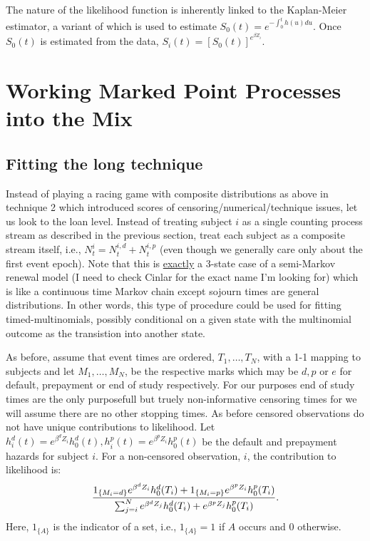 \documentclass[10pt]{article}
\begin{document}
The nature of the likelihood function is inherently linked to the Kaplan-Meier estimator, a variant of which is used to estimate $S_0(t)=e^{-\int_0^th(u)du}$. 
Once $S_0(t)$ is estimated from the data, $S_i(t)=[S_0(t)]^{e^{\beta Z_i}}$.

\section{Working Marked Point Processes into the Mix}

\subsection{Fitting the long technique}

Instead of playing a racing game with composite distributions as above in technique 2 which introduced scores of censoring/numerical/technique issues, let us 
look to the loan level.  Instead of treating subject $i$ as a single counting process stream as described in the previous section, treat each subject as a 
composite stream itself, i.e., $N^i_t=N^{i,d}_t+N^{i,p}_t$ (even though we generally care only about the first event epoch).
Note that 
this is \underline{exactly} a 3-state case of a semi-Markov renewal model (I need to check Cinlar for the exact name I'm looking for) which is like a continuous 
time Markov chain except sojourn times are general distributions.  In other words, this type of procedure could be used for fitting timed-multinomials, 
possibly conditional on a given state with the multinomial outcome as the transistion into another state.

As before, assume that event times are ordered, $T_1, \ldots, T_N$, with a 1-1 mapping to subjects and let $M_1, \ldots, M_N$, be the respective marks which 
may be $d, p$ or $e$ for default, prepayment or end of study respectively.  For our purposes end of study times are the only purposefull but truely non-informative 
censoring times for we will assume there are no other stopping times.  As before censored observations do not have unique contributions to likelihood.  Let 
$h^d_i(t)=e^{\beta^d Z_i}h^d_0(t), h^p_i(t)=e^{\beta^p Z_i}h^p_0(t)$ be the default and prepayment hazards for subject $i$.
For a non-censored observation, $i$, the contribution to likelihood is:
$$ {{1_{\{M_i=d\}}e^{\beta^d Z_i}h^d_0(T_i)+1_{\{M_i=p\}}e^{\beta^p Z_i}h^p_0(T_i) } 
\over { \sum_{j=i}^N e^{\beta^d Z_j}h^d_0(T_i)+e^{\beta^p Z_j}h^p_0(T_i) } }.$$
Here, $1_{\{A\}}$ is the indicator of a set, i.e., $1_{\{A\}}=1$ if $A$ occurs and 0 otherwise.
\end{document}
